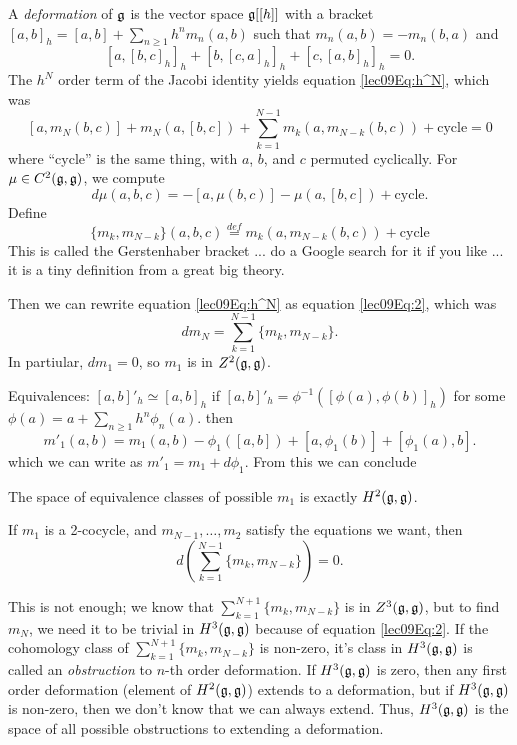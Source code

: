 
 A \emph{deformation} of $\mathfrak{g}$ is the vector space
 $\mathfrak{g}[[h]]$ with a bracket $[a,b]_{h} =[a,b]+\sum_{n\geq1}h^{n}m_{n}(a,b)$ such that
 $m_{n}(a,b)=-m_{n}(b,a)$ and
 \[
 [a,[b,c]_{h}]_{h}+[b,[c,a]_{h}]_{h}+[c,[a,b]_{h}]_{h}=0.
 \]
 The $h^{N}$ order term of the Jacobi identity yields equation \ref{lec09Eq:h^N},
 which was
 \[
 [a,m_{N}(b,c)]+m_{N}(a,[b,c])+\sum_{k=1}^{N-1}m_{k}(a,m_{N-k}(b,c))+\text{cycle}=0
 \]
 where ``cycle'' is the same thing, with $a$, $b$, and $c$ permuted cyclically.
 For $\mu\in C^{2}(\mathfrak{g},\mathfrak{g})$, we compute
 \[
 d\mu(a,b,c)=-[a,\mu(b,c)]-\mu(a,[b,c])+\text{cycle}.
 \]
 Define
 \[
 \{m_{k},m_{N-k}\}(a,b,c)\overset{def}{=}m_{k}(a,m_{N-k}(b,c))+\text{cycle}%
 \]
 This is called the Gerstenhaber bracket ... do a Google search for it if you like ...
 it is a tiny definition from a great big theory.

 Then we can rewrite equation \ref{lec09Eq:h^N} as equation \ref{lec09Eq:2}, which was
 \[
 dm_{N} = \sum_{k=1}^{N-1} \{m_{k},m_{N-k}\}. %
 \]
 In partiular, $dm_{1}=0$, so $m_{1}$ is in $Z^{2}(\mathfrak{g},\mathfrak{g})$.

 Equivalences: $[a,b]'_{h}\simeq[a,b]_{h}$ if $[a,b]'_{h}=
 \phi^{-1}([\phi(a),\phi(b)]_{h})$ for some $\phi(a) = a+\sum_{n\ge1} h^{n}
 \phi_{n}(a)$. then
 \[
  m'_{1}(a,b) = m_{1}(a,b) - \phi_{1}([a,b]) + [a,\phi_{1}(b)] + [\phi _{1}(a),b].
 \]
 which we can write as $m'_{1} = m_{1}+d\phi_{1}$. From this we can conclude

 \begin{claim}
 The space of equivalence classes of possible $m_{1}$ is exactly
 $H^{2}(\mathfrak{g},\mathfrak{g})$.
 \end{claim}

 \begin{claim}
 [was HW]If $m_{1}$ is a 2-cocycle, and $m_{N-1},\dots, m_{2}$ satisfy the equations we
 want, then
 \[
 d\left(  \sum_{k=1}^{N-1} \{m_{k},m_{N-k}\} \right)  = 0.
 \]
 \end{claim}

 This is not enough; we know that $\sum_{k=1}^{N+1}\{m_{k},m_{N-k}\}$ is in
 $Z^{3}(\mathfrak{g},\mathfrak{g})$, but to find $m_{N}$, we need it to be trivial in $H^{3}(\mathfrak{g},\mathfrak{g})$
 because of equation \ref{lec09Eq:2}. If the cohomology class of
 $\sum_{k=1}^{N+1}\{m_{k},m_{N-k}\}$ is non-zero, it's class in $H^3(\mathfrak{g},\mathfrak{g})$ is called
 an \emph{obstruction} to $n$-th order deformation. If $H^{3}(\mathfrak{g},\mathfrak{g})$ is zero, then
 any first order deformation (element of $H^{2}(\mathfrak{g},\mathfrak{g})$) extends to a deformation, but
 if $H^{3}(\mathfrak{g},\mathfrak{g})$ is non-zero, then we don't know that we can always extend. Thus,
 $H^3(\mathfrak{g},\mathfrak{g})$ is the space of all possible obstructions to extending a deformation.

